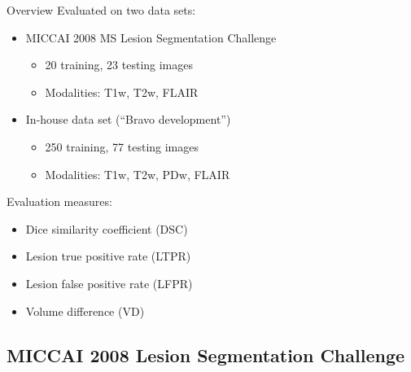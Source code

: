 \documentclass{beamer}
\begin{document}
\begin{frame}{Overview}
Evaluated on two data sets:
\begin{itemize}
\item MICCAI 2008 MS Lesion Segmentation Challenge
\begin{itemize}
\item 20 training, 23 testing images
\item Modalities: T1w, T2w, FLAIR 
\end{itemize}
\item In-house data set (``Bravo development'')
\begin{itemize}
\item 250 training, 77 testing images
\item Modalities: T1w, T2w, PDw, FLAIR
\end{itemize}
\end{itemize}
\vspace{1em}
Evaluation measures:
\begin{itemize}
\item Dice similarity coefficient (DSC)
\item Lesion true positive rate (LTPR)
\item Lesion false positive rate (LFPR)
\item Volume difference (VD)
\end{itemize}
\end{frame}

\subsection{MICCAI 2008 Lesion Segmentation Challenge}
\end{document}
